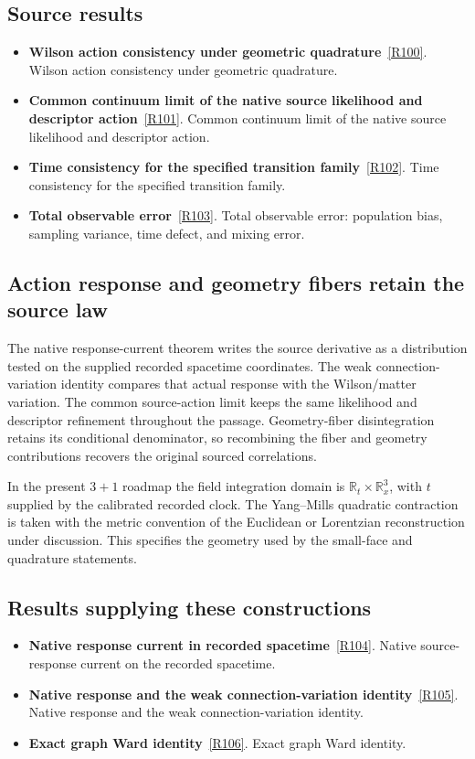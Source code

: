 \documentclass[11pt,a4paper]{article}
\begin{document}
\subsection*{Source results}
\begin{itemize}
\item \textbf{Wilson action consistency under geometric quadrature}~\hyperref[src:thm-continuum-limit-ym]{[R100]}. Wilson action consistency under geometric quadrature.
\item \textbf{Common continuum limit of the native source likelihood and descriptor action}~\hyperref[src:thm-ym-continuum-source-action]{[R101]}. Common continuum limit of the native source likelihood and descriptor action.
\item \textbf{Time consistency for the specified transition family}~\hyperref[src:thm-correct-continuum-limit]{[R102]}. Time consistency for the specified transition family.
\item \textbf{Total observable error}~\hyperref[src:thm-total-error-bound]{[R103]}. Total observable error: population bias, sampling variance, time defect, and mixing error.
\end{itemize}
\subsection*{Action response and geometry fibers retain the source law}
The native response-current theorem writes the source derivative as a distribution tested on the supplied recorded spacetime coordinates. The weak connection-variation identity compares that actual response with the Wilson/matter variation. The common source-action limit keeps the same likelihood and descriptor refinement throughout the passage. Geometry-fiber disintegration retains its conditional denominator, so recombining the fiber and geometry contributions recovers the original sourced correlations.

In the present \(3+1\) roadmap the field integration domain is \(\mathbb R_t\times\mathbb R_x^3\), with \(t\) supplied by the calibrated recorded clock. The Yang--Mills quadratic contraction is taken with the metric convention of the Euclidean or Lorentzian reconstruction under discussion. This specifies the geometry used by the small-face and quadrature statements.
\subsection*{Results supplying these constructions}
\begin{itemize}
\item \textbf{Native response current in recorded spacetime}~\hyperref[src:thm-ym-native-response-current]{[R104]}. Native source-response current on the recorded spacetime.
\item \textbf{Native response and the weak connection-variation identity}~\hyperref[src:prop-ym-native-connection-variation-identity]{[R105]}. Native response and the weak connection-variation identity.
\item \textbf{Exact graph Ward identity}~\hyperref[src:lem-ym-discrete-ward]{[R106]}. Exact graph Ward identity.
\end{itemize}
\end{document}
